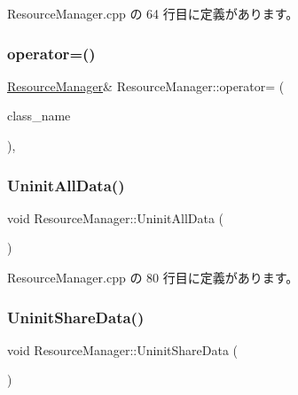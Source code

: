  Resource\+Manager.\+cpp の 64 行目に定義があります。

\mbox{\label{class_resource_manager_a9c420ee8ffde51a27fe6ca37229ffa83}} 
\subsubsection{\texorpdfstring{operator=()}{operator=()}}
{\footnotesize\ttfamily \mbox{\hyperlink{class_resource_manager}{Resource\+Manager}}\& Resource\+Manager\+::operator= (\begin{DoxyParamCaption}\item[{const \mbox{\hyperlink{class_resource_manager}{Resource\+Manager}} \&}]{class\+\_\+name }\end{DoxyParamCaption})\hspace{0.3cm}{\ttfamily [private]}, {\ttfamily [delete]}}

\mbox{\label{class_resource_manager_a8d96f0a74a92212e8b2948467bb3cac7}} 
\subsubsection{\texorpdfstring{Uninit\+All\+Data()}{UninitAllData()}}
{\footnotesize\ttfamily void Resource\+Manager\+::\+Uninit\+All\+Data (\begin{DoxyParamCaption}{ }\end{DoxyParamCaption})\hspace{0.3cm}{\ttfamily [static]}}



 Resource\+Manager.\+cpp の 80 行目に定義があります。

\mbox{\label{class_resource_manager_a786915d9c4df5a023a43db8c5332cb93}} 
\subsubsection{\texorpdfstring{Uninit\+Share\+Data()}{UninitShareData()}}
{\footnotesize\ttfamily void Resource\+Manager\+::\+Uninit\+Share\+Data (\begin{DoxyParamCaption}{ }\end{DoxyParamCaption})\hspace{0.3cm}{\ttfamily [static]}}



